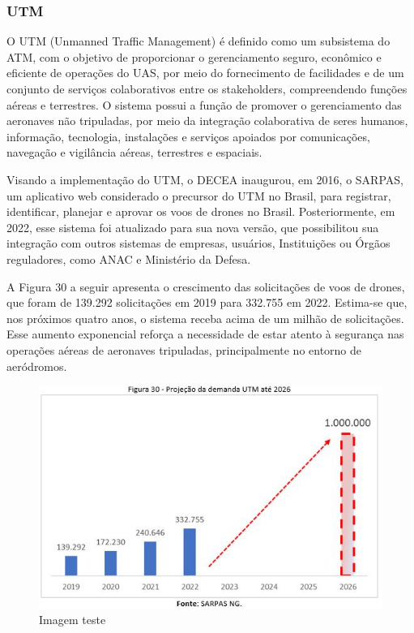 \documentclass[
]{book}
\begin{document}
\hypertarget{utm}{%
\subsubsection{UTM}\label{utm}}

O UTM (Unmanned Traffic Management) é definido como um subsistema do ATM, com o objetivo de proporcionar o gerenciamento seguro, econômico e eficiente de operações do UAS, por meio do fornecimento de facilidades e de um conjunto de serviços colaborativos entre os stakeholders, compreendendo funções aéreas e terrestres. O sistema possui a função de promover o gerenciamento das aeronaves não tripuladas, por meio da integração colaborativa de seres humanos, informação, tecnologia, instalações e serviços apoiados por comunicações, navegação e vigilância aéreas, terrestres e espaciais.

Visando a implementação do UTM, o DECEA inaugurou, em 2016, o SARPAS, um aplicativo web considerado o precursor do UTM no Brasil, para registrar, identificar, planejar e aprovar os voos de drones no Brasil. Posteriormente, em 2022, esse sistema foi atualizado para sua nova versão, que possibilitou sua integração com outros sistemas de empresas, usuários, Instituições ou Órgãos reguladores, como ANAC e Ministério da Defesa.

A Figura 30 a seguir apresenta o crescimento das solicitações de voos de drones, que foram de 139.292 solicitações em 2019 para 332.755 em 2022. Estima-se que, nos próximos quatro anos, o sistema receba acima de um milhão de solicitações. Esse aumento exponencial reforça a necessidade de estar atento à segurança nas operações aéreas de aeronaves tripuladas, principalmente no entorno de aeródromos.

\begin{figure}
\centering
\includegraphics{imagens/fig34.jpg}
\caption{Imagem teste}
\end{figure}
\end{document}
